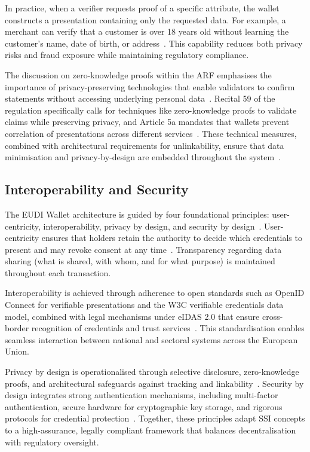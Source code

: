 \documentclass[sigconf,balance,nonacm,authordraft]{acmart}
\begin{document}
In practice, when a verifier requests proof of a specific attribute, the wallet constructs a presentation containing only the requested data. For example, a merchant can verify that a customer is over 18 years old without learning the customer's name, date of birth, or address~\cite{ISC2_SelectDisclosureExample,DocuSign_SelectDisclosure}. This capability reduces both privacy risks and fraud exposure while maintaining regulatory compliance.

The discussion on zero-knowledge proofs within the ARF emphasises the importance of privacy-preserving technologies that enable validators to confirm statements without accessing underlying personal data~\cite{ZKPDiscussion_Recital59}. Recital 59 of the regulation specifically calls for techniques like zero-knowledge proofs to validate claims while preserving privacy, and Article 5a mandates that wallets prevent correlation of presentations across different services~\cite{ZKPDiscussion_Recital59,ZKPDiscussion_Article5a}. These technical measures, combined with architectural requirements for unlinkability, ensure that data minimisation and privacy-by-design are embedded throughout the system~\cite{Potential_PrivacyDesign}.

\subsection{Interoperability and Security}

The EUDI Wallet architecture is guided by four foundational principles: user-centricity, interoperability, privacy by design, and security by design~\cite{ISC2_GuidingPrinciples}. User-centricity ensures that holders retain the authority to decide which credentials to present and may revoke consent at any time~\cite{ISC2_ConsentRole,Potential_UserCentricity}. Transparency regarding data sharing (what is shared, with whom, and for what purpose) is maintained throughout each transaction.

Interoperability is achieved through adherence to open standards such as OpenID Connect for verifiable presentations and the W3C verifiable credentials data model, combined with legal mechanisms under eIDAS 2.0 that ensure cross-border recognition of credentials and trust services~\cite{Finextra_SSI_Components}. This standardisation enables seamless interaction between national and sectoral systems across the European Union.

Privacy by design is operationalised through selective disclosure, zero-knowledge proofs, and architectural safeguards against tracking and linkability~\cite{ZKPDiscussion_Article5a,Potential_PrivacyDesign}. Security by design integrates strong authentication mechanisms, including multi-factor authentication, secure hardware for cryptographic key storage, and rigorous protocols for credential protection~\cite{ISC2_GuidingPrinciples,Potential_SecurityDesign}. Together, these principles adapt SSI concepts to a high-assurance, legally compliant framework that balances decentralisation with regulatory oversight.
\end{document}
